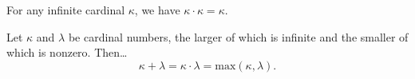 
\begin{lemma}
For any infinite cardinal $\kappa$, we have $\kappa \cdot \kappa = \kappa.$
\end{lemma}

\begin{theorem}
Let $\kappa$ and $\lambda$ be cardinal numbers, the larger of which is infinite and the smaller of which is nonzero. Then\dots
$$\kappa + \lambda = \kappa \cdot \lambda = \textrm{max}(\kappa,\lambda).$$
\end{theorem}